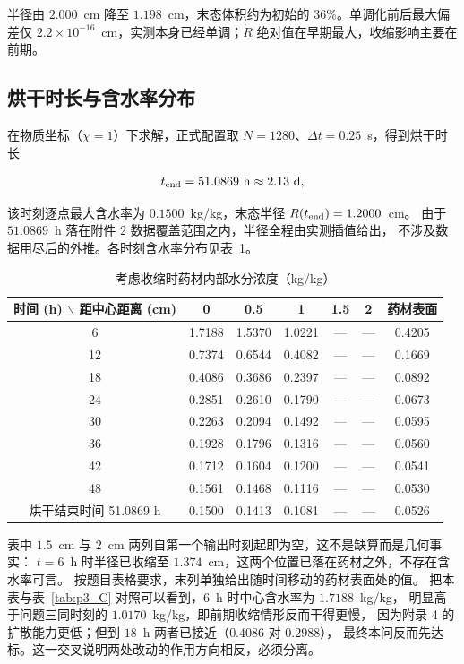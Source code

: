 半径由 $2.000$~cm 降至 $1.198$~cm，末态体积约为初始的 $36\%$。单调化前后最大偏差仅
$2.2\times10^{-16}$~cm，实测本身已经单调；$\dot R$ 绝对值在早期最大，收缩影响主要在前期。

\subsection{烘干时长与含水率分布}

在物质坐标（$\chi=1$）下求解，正式配置取 $N=1280$、$\Delta t=0.25$~s，得到烘干时长

\begin{equation}\label{eq:p4_answer}
t_{\rm end}=51.0869~\mathrm{h}\approx 2.13~\mathrm{d},
\end{equation}

该时刻逐点最大含水率为 $0.1500$~kg/kg，末态半径 $R(t_{\rm end})=1.2000$~cm。
由于 $51.0869$~h 落在附件 2 数据覆盖范围之内，半径全程由实测插值给出，
不涉及数据用尽后的外推。各时刻含水率分布见表~\ref{tab:p4_C}。

\begin{table}[H]
\centering
\caption{考虑收缩时药材内部水分浓度（kg/kg）}\label{tab:p4_C}
\begin{tabular}{ccccccc}
\toprule
时间 (h) $\backslash$ 距中心距离 (cm) & 0 & 0.5 & 1 & 1.5 & 2 & 药材表面 \\
\midrule
6  & 1.7188 & 1.5370 & 1.0221 & --- & --- & 0.4205 \\
12 & 0.7374 & 0.6544 & 0.4082 & --- & --- & 0.1669 \\
18 & 0.4086 & 0.3686 & 0.2397 & --- & --- & 0.0892 \\
24 & 0.2851 & 0.2610 & 0.1790 & --- & --- & 0.0673 \\
30 & 0.2263 & 0.2094 & 0.1492 & --- & --- & 0.0595 \\
36 & 0.1928 & 0.1796 & 0.1316 & --- & --- & 0.0560 \\
42 & 0.1712 & 0.1604 & 0.1200 & --- & --- & 0.0541 \\
48 & 0.1561 & 0.1468 & 0.1116 & --- & --- & 0.0530 \\
烘干结束时间 51.0869 h & 0.1500 & 0.1413 & 0.1081 & --- & --- & 0.0526 \\
\bottomrule
\end{tabular}
\end{table}

表中 $1.5$~cm 与 $2$~cm 两列自第一个输出时刻起即为空，这不是缺算而是几何事实：
$t=6$~h 时半径已收缩至 $1.374$~cm，这两个位置已落在药材之外，不存在含水率可言。
按题目表格要求，末列单独给出随时间移动的药材表面处的值。
把本表与表~\ref{tab:p3_C} 对照可以看到，$6$~h 时中心含水率为 $1.7188$~kg/kg，
明显高于问题三同时刻的 $1.0170$~kg/kg，即前期收缩情形反而干得更慢，
因为附录 4 的扩散能力更低；但到 $18$~h 两者已接近（$0.4086$ 对 $0.2988$），
最终本问反而先达标。这一交叉说明两处改动的作用方向相反，必须分离。

